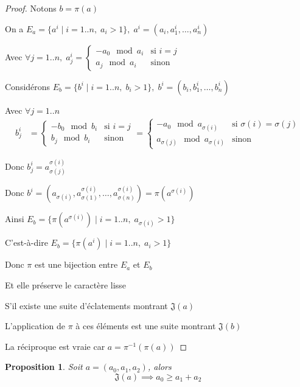 \documentclass{article}
\newtheorem{proposition}{Proposition}
\begin{document}
\begin{proof}
    Notons $b = \pi(a)$

    On a $E_a = \{ a^i \mid i = 1..n,\; a_i > 1 \},\; a^i = (a_i, a_1^i, \dots, a_n^i)$

    Avec $\forall j = 1..n,\; a_j^i = \begin{cases}
            -a_0 \mod a_i & \text{si } i = j \\
            a_j \mod a_i  & \text{sinon}
        \end{cases}$

    Considérons $E_b = \{b^i \mid i = 1..n,\; b_i > 1\},\; b^i = (b_i, b_1^i, \dots, b_n^i)$

    Avec $\forall j = 1..n$ \begin{align*}
        b_j^i & = \begin{cases}
                      -b_0 \mod b_i & \text{si } i = j \\
                      b_j \mod b_i  & \text{sinon}
                  \end{cases}
        = \begin{cases}
              -a_0 \mod a_{\sigma(i)}          & \text{si } \sigma(i) = \sigma(j) \\
              a_{\sigma(j)} \mod a_{\sigma(i)} & \text{sinon}
          \end{cases}
    \end{align*}

    Donc $b_j^i= a_{\sigma(j)}^{\sigma(i)}$

    Donc $b^i = (a_{\sigma(i)}, a_{\sigma(1)}^{\sigma(i)}, \dots, a_{\sigma(n)}^{\sigma(i)}) = \pi(a^{\sigma(i)})$

    Ainsi $E_b = \{ \pi(a^{\sigma(i)}) \mid i = 1..n,\; a_{\sigma(i)} > 1 \}$

    C'est-à-dire $E_b = \{ \pi(a^i) \mid i = 1..n,\; a_i > 1\}$

    Donc $\pi$ est une bijection entre $E_a$ et $E_b$

    Et elle préserve le caractère lisse

    S'il existe une suite d'éclatements montrant $\mathfrak{J}(a)$

    L'application de $\pi$ à ces éléments est une suite montrant $\mathfrak{J}(b)$

    La réciproque est vraie car $a = \pi^{-1}(\pi(a))$
\end{proof}

\newpage

\begin{proposition}
    Soit $a=(a_0, a_1, a_2)$, alors
    $$\mathfrak{J}(a) \implies a_0 \geq a_1 + a_2$$
\end{proposition}
\end{document}

